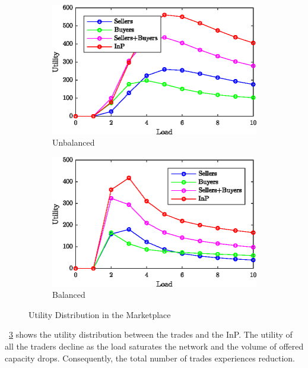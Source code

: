 \begin{figure}[htbp]
\centering
\begin{subfigure}{0.7\columnwidth}
\includegraphics[width=\columnwidth]{Figures/U-Utility-s-b-traders.eps}%
\caption{Unbalanced}%
\label{fig:utility:unbalanced}%
\end{subfigure}\hfill%
\begin{subfigure}{0.7\columnwidth}
\includegraphics[width=\columnwidth]{Figures/B-Utility-s-b-traders.eps}%
\caption{Balanced}%
\label{fig:utility:balanced}%
\end{subfigure}\hfill%
\caption{Utility Distribution in the Marketplace}
\label{fig:utility}%
\end{figure}
\figureautorefname~\ref{fig:utility} shows the utility distribution between the trades and the InP. The utility of all the traders decline as the load saturates the network and the volume of offered capacity drops. Consequently, the total number of trades experiences reduction.


